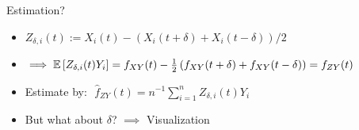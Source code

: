 % 
% 


\begin{frame}{Estimation?}
    \begin{itemize}
    \setlength\itemsep{1.5em}
        \item[\labelitem] $Z_{\delta, i}(t) := X_i(t) - \left(X_i(t + \delta) + X_i(t -
            \delta)\right) / 2$
        \item[\labelitem] $\implies \mathbb{E}\left[Z_{\delta, i}(t) Y_i\right] = f_{XY}(t) -
            \frac{1}{2}\left(f_{XY}(t + \delta) + f_{XY}(t - \delta)\right) = f_{ZY}(t)$
        \item[\labelitem] Estimate by: $\,\, \hat{f}_{ZY}(t) = n^{-1}\sum_{i=1}^n
            Z_{\delta, i}(t) Y_i$
        \item[\labelitem] But what about $\delta$? $\implies$ Visualization
    \end{itemize}
\end{frame}

